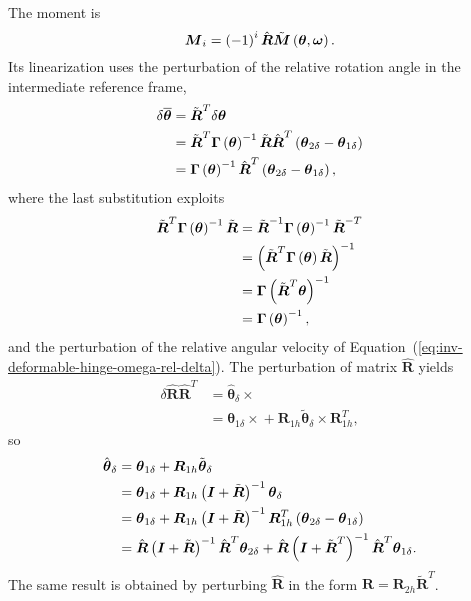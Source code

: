 \documentclass[10pt,dvips,fleqn]{report}
\newcommand{\T}[1]{\boldsymbol{#1}}
\begin{document}
The moment is
\begin{equation}
	\T{M}_i = \plbr{-1}^i \hat{\T{R}} \tilde{\T{M}}\plbr{\T{\theta}, \T{\omega}} .
\end{equation}
Its linearization uses the perturbation of the relative rotation angle
in the intermediate reference frame,
\begin{align}
	\delta\overline{\T{\theta}}
	&= \tilde{\T{R}}^T \delta\T{\theta} \\
	&= \tilde{\T{R}}^T \T{\Gamma}\plbr{\T{\theta}}^{-1} \tilde{\T{R}} \hat{\T{R}}^T \plbr{\T{\theta}_{2\delta} - \T{\theta}_{1\delta}} \\
	&= \T{\Gamma}\plbr{\T{\theta}}^{-1} \hat{\T{R}}^T \plbr{\T{\theta}_{2\delta} - \T{\theta}_{1\delta}} ,
\end{align}
where the last substitution exploits
\begin{align}
	\tilde{\T{R}}^T \T{\Gamma}\plbr{\T{\theta}}^{-1} \tilde{\T{R}}
	&= \tilde{\T{R}}^{-1} \T{\Gamma}\plbr{\T{\theta}}^{-1} \tilde{\T{R}}^{-T} \\
	&= \plbr{
		\tilde{\T{R}}^T \T{\Gamma}\plbr{\T{\theta}} \tilde{\T{R}}
	}^{-1} \\
	&= \T{\Gamma}\plbr{\tilde{\T{R}}^T \T{\theta}}^{-1} \\
	&= \T{\Gamma}\plbr{\T{\theta}}^{-1} ,
\end{align}
and the perturbation of the relative angular velocity
of Equation~(\ref{eq:inv-deformable-hinge-omega-rel-delta}).
The perturbation of matrix $\hat{\T{R}}$ yields
\begin{align}
	\delta\hat{\T{R}} \hat{\T{R}}^T
	&= \hat{\T{\theta}}_{\delta} \times{} \\
	&= \T{\theta}_{1\delta} \times{}
	+ \T{R}_{1h} \tilde{\T{\theta}}_{\delta}\times \T{R}_{1h}^T ,
\end{align}
so
\begin{align}
	\hat{\T{\theta}}_{\delta}
	&= \T{\theta}_{1\delta}
	+ \T{R}_{1h} \tilde{\T{\theta}}_{\delta} \\
	&= \T{\theta}_{1\delta}
	+ \T{R}_{1h} \plbr{\T{I} + \tilde{\T{R}}}^{-1} \T{\theta}_{\delta} \\
	&= \T{\theta}_{1\delta}
	+ \T{R}_{1h} \plbr{\T{I} + \tilde{\T{R}}}^{-1} \T{R}_{1h}^T\plbr{
		\T{\theta}_{2\delta}
		- \T{\theta}_{1\delta}
	} \\
	&= \hat{\T{R}} \plbr{\T{I} + \tilde{\T{R}}}^{-1} \hat{\T{R}}^T
		\T{\theta}_{2\delta}
	+ \hat{\T{R}} \plbr{\T{I} + \tilde{\T{R}}^T}^{-1} \hat{\T{R}}^T
		\T{\theta}_{1\delta} .
\end{align}
The same result is obtained by perturbing 
$\hat{\T{R}}$ in the form $\hat{\T{R}}=\T{R}_{2h}\tilde{\T{R}}^T$.
\end{document}
